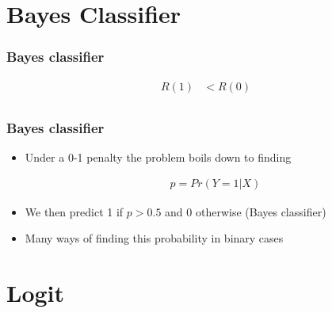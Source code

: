 \documentclass[
  shownotes,
  xcolor={svgnames},
  hyperref={colorlinks,citecolor=DarkBlue,linkcolor=andesred,urlcolor=DarkBlue}
  , aspectratio=169]{beamer}
\begin{document}
\section{Bayes Classifier}

\begin{frame}[t]
\frametitle{Bayes classifier}

\begin{eqnarray}
R(1) &< R(0)  \\[10pt] \nonumber 
\end{eqnarray}


\end{frame}
\begin{frame}[fragile]
\frametitle{Bayes classifier}

\begin{itemize}
  \item Under a 0-1 penalty the problem boils down to finding 

\begin{align}
p=Pr(Y=1|X)
\end{align}
  
  \medskip
  \item We then predict 1 if $p>0.5$ and 0 otherwise (Bayes classifier)
  \medskip
  \item Many ways of finding this probability in binary cases
\end{itemize}


\end{frame}
\section{Logit}
\end{document}
